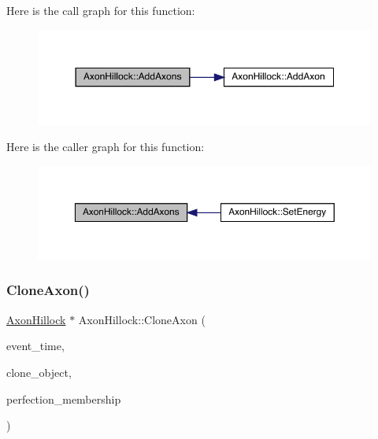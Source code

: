 Here is the call graph for this function\+:\nopagebreak
\begin{figure}[H]
\begin{center}
\leavevmode
\includegraphics[width=350pt]{class_axon_hillock_a54a82227b96757f1c0d7450df6a3df37_cgraph}
\end{center}
\end{figure}
Here is the caller graph for this function\+:\nopagebreak
\begin{figure}[H]
\begin{center}
\leavevmode
\includegraphics[width=350pt]{class_axon_hillock_a54a82227b96757f1c0d7450df6a3df37_icgraph}
\end{center}
\end{figure}
\mbox{\label{class_axon_hillock_ad54833cee03cfcacb5e88d174048aaa4}} 
\subsubsection{\texorpdfstring{Clone\+Axon()}{CloneAxon()}}
{\footnotesize\ttfamily \hyperlink{class_axon_hillock}{Axon\+Hillock} $\ast$ Axon\+Hillock\+::\+Clone\+Axon (\begin{DoxyParamCaption}\item[{std\+::chrono\+::time\+\_\+point$<$ \hyperlink{universe_8h_a0ef8d951d1ca5ab3cfaf7ab4c7a6fd80}{Clock} $>$}]{event\+\_\+time,  }\item[{\hyperlink{class_axon_hillock}{Axon\+Hillock} $\ast$}]{clone\+\_\+object,  }\item[{double}]{perfection\+\_\+membership }\end{DoxyParamCaption})}



